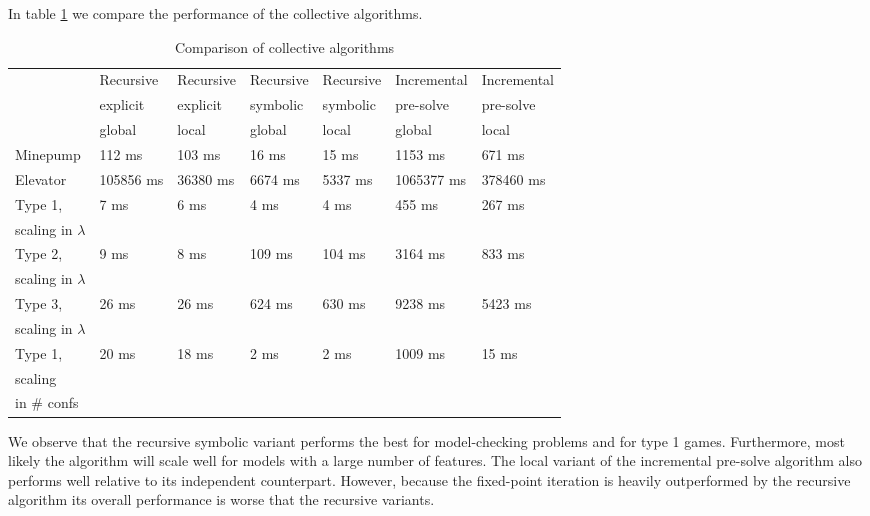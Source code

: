 In table \ref{tab_compare_collective_algs} we compare the performance of the collective algorithms.
\begin{table}[h]
	\centering
	\begin{tabular}{|l|l|l|l|l|l|l|}
		\hline
		& Recursive&Recursive &Recursive &Recursive & Incremental& Incremental\\
		& explicit &explicit & symbolic &symbolic & pre-solve &pre-solve\\
		& global & local &global  & local & global & local
		\\ \hline
		Minepump& 112 ms& 103 ms& 16 ms& 15 ms& 1153 ms& 671 ms\\ \hline
		Elevator& 105856 ms& 36380 ms& 6674 ms& 5337 ms& 1065377 ms& 378460 ms\\ \hline
		Type 1, & \multirow{2}{*}{7 ms}& \multirow{2}{*}{6 ms} & \multirow{2}{*}{4 ms} & \multirow{2}{*}{4 ms} & \multirow{2}{*}{455 ms} & \multirow{2}{*}{267 ms}\\
		scaling in $\lambda$& & & & & &\\ \hline
		Type 2,& \multirow{2}{*}{9 ms} & \multirow{2}{*}{8 ms} & \multirow{2}{*}{109 ms} & \multirow{2}{*}{104 ms} & \multirow{2}{*}{3164 ms} & \multirow{2}{*}{833 ms} \\
		scaling in $\lambda$& & & & & &\\ \hline
		Type 3,& \multirow{2}{*}{26 ms} & \multirow{2}{*}{26 ms} & \multirow{2}{*}{624 ms} & \multirow{2}{*}{630 ms} & \multirow{2}{*}{9238 ms} & \multirow{2}{*}{5423 ms}\\ 
		scaling in $\lambda$& & & & & &\\ \hline
		Type 1,& \multirow{3}{*}{20 ms} & \multirow{3}{*}{18 ms} & \multirow{3}{*}{2 ms} & \multirow{3}{*}{2 ms} & \multirow{3}{*}{1009 ms} & \multirow{3}{*}{15 ms} \\
		scaling& & & & & &\\
		in \# confs& & & & & &\\ \hline
	\end{tabular}
	\caption{Comparison of collective algorithms}
	\label{tab_compare_collective_algs}
\end{table}
We observe that the recursive symbolic variant performs the best for model-checking problems and for type 1 games. Furthermore, most likely the algorithm will scale well for models with a large number of features. The local variant of the incremental pre-solve algorithm also performs well relative to its independent counterpart. However, because the fixed-point iteration is heavily outperformed by the recursive algorithm its overall performance is worse that the recursive variants.

